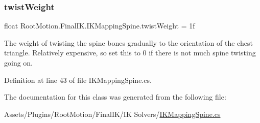 \subsubsection{\texorpdfstring{twist\+Weight}{twistWeight}}
{\footnotesize\ttfamily float Root\+Motion.\+Final\+I\+K.\+I\+K\+Mapping\+Spine.\+twist\+Weight = 1f}



The weight of twisting the spine bones gradually to the orientation of the chest triangle. Relatively expensive, so set this to 0 if there is not much spine twisting going on. 



Definition at line 43 of file I\+K\+Mapping\+Spine.\+cs.



The documentation for this class was generated from the following file\+:\begin{DoxyCompactItemize}
\item 
Assets/\+Plugins/\+Root\+Motion/\+Final\+I\+K/\+I\+K Solvers/\mbox{\hyperlink{_i_k_mapping_spine_8cs}{I\+K\+Mapping\+Spine.\+cs}}\end{DoxyCompactItemize}
